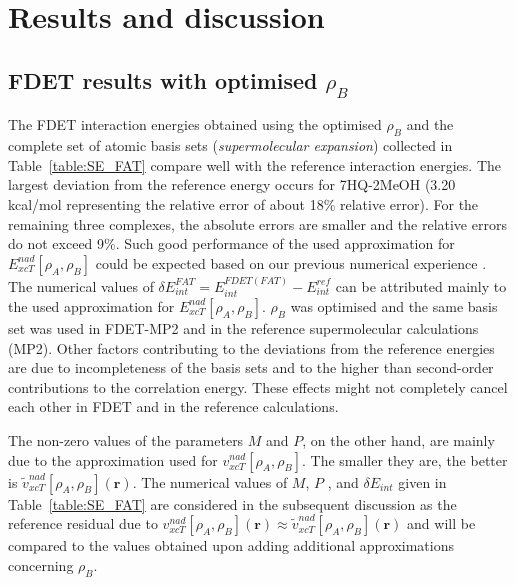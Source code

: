 \documentclass[amsmath,amssymb,preprint,aip,jcp]{revtex4-1}
\begin{document}
\section{Results and discussion}
\subsection{FDET results with optimised $\rho_B$}
The FDET interaction energies obtained using the optimised $\rho_B$ and the complete set of atomic basis sets ({\it supermolecular expansion}) collected in Table~\ref{table:SE_FAT} compare well with the reference interaction energies. 
The largest deviation from the reference energy occurs for 7HQ-2MeOH (3.20 kcal/mol representing the relative error of about 18\% relative error). 
For the remaining three complexes, the absolute errors are smaller and the relative errors do not exceed 9\%.
Such good performance of the used approximation for $E_{xcT}^{nad}[\rho_A,\rho_B]$
could be expected based on our previous numerical experience \cite{Wesolowski2003a,Kevorkyants2006,Dulak2007a}. The numerical values of $
\delta E_{int}^{FAT}=E^{FDET(FAT)}_{int}-E_{int}^{ref}\label{eq:def_err_en}$
 can be attributed mainly to the used approximation for $E_{xcT}^{nad}[\rho_A,\rho_B]$. 
 $\rho_B$ was optimised and the same basis set was used in FDET-MP2 and in the reference supermolecular calculations (MP2). 
Other factors contributing to the deviations from the reference energies are due to incompleteness of the basis sets and to the higher than second-order contributions to the correlation energy. These effects might not completely cancel each other in FDET and in the reference calculations. 

The non-zero values of the parameters $M$ and $P$, on the other hand, are mainly due to the approximation used for $v_{xcT}^{nad}[\rho_A,\rho_B]$. 
The smaller they are, the better is $\tilde{v}_{xcT}^{nad}[\rho_A,\rho_B](\mathbf{r})$.
The numerical values of $M$, $P$ , and $\delta E_{int}$ given in Table~\ref{table:SE_FAT} are considered in the subsequent discussion as the reference residual due to ${v}_{xcT}^{nad}[\rho_A,\rho_B](\mathbf{r})\approx\tilde{v}_{xcT}^{nad}[\rho_A,\rho_B](\mathbf{r})$ and will be compared to the values obtained upon adding additional approximations concerning $\rho_B$.
\end{document}
